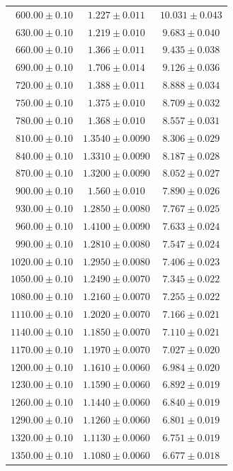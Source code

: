 \documentclass[a4paper,11pt]{article}
\begin{document}
\begin{longtable}{r c c}
$600.00 \pm 0.10$ & $1.227 \pm 0.011$ & $10.031 \pm 0.043$ \\
$630.00 \pm 0.10$ & $1.219 \pm 0.010$ & $9.683 \pm 0.040$ \\
$660.00 \pm 0.10$ & $1.366 \pm 0.011$ & $9.435 \pm 0.038$ \\
$690.00 \pm 0.10$ & $1.706 \pm 0.014$ & $9.126 \pm 0.036$ \\
$720.00 \pm 0.10$ & $1.388 \pm 0.011$ & $8.888 \pm 0.034$ \\
$750.00 \pm 0.10$ & $1.375 \pm 0.010$ & $8.709 \pm 0.032$ \\
$780.00 \pm 0.10$ & $1.368 \pm 0.010$ & $8.557 \pm 0.031$ \\
$810.00 \pm 0.10$ & $1.3540 \pm 0.0090$ & $8.306 \pm 0.029$ \\
$840.00 \pm 0.10$ & $1.3310 \pm 0.0090$ & $8.187 \pm 0.028$ \\
$870.00 \pm 0.10$ & $1.3200 \pm 0.0090$ & $8.052 \pm 0.027$ \\
$900.00 \pm 0.10$ & $1.560 \pm 0.010$ & $7.890 \pm 0.026$ \\
$930.00 \pm 0.10$ & $1.2850 \pm 0.0080$ & $7.767 \pm 0.025$ \\
$960.00 \pm 0.10$ & $1.4100 \pm 0.0090$ & $7.633 \pm 0.024$ \\
$990.00 \pm 0.10$ & $1.2810 \pm 0.0080$ & $7.547 \pm 0.024$ \\
$1020.00 \pm 0.10$ & $1.2950 \pm 0.0080$ & $7.406 \pm 0.023$ \\
$1050.00 \pm 0.10$ & $1.2490 \pm 0.0070$ & $7.345 \pm 0.022$ \\
$1080.00 \pm 0.10$ & $1.2160 \pm 0.0070$ & $7.255 \pm 0.022$ \\
$1110.00 \pm 0.10$ & $1.2020 \pm 0.0070$ & $7.166 \pm 0.021$ \\
$1140.00 \pm 0.10$ & $1.1850 \pm 0.0070$ & $7.110 \pm 0.021$ \\
$1170.00 \pm 0.10$ & $1.1970 \pm 0.0070$ & $7.027 \pm 0.020$ \\
$1200.00 \pm 0.10$ & $1.1610 \pm 0.0060$ & $6.984 \pm 0.020$ \\
$1230.00 \pm 0.10$ & $1.1590 \pm 0.0060$ & $6.892 \pm 0.019$ \\
$1260.00 \pm 0.10$ & $1.1440 \pm 0.0060$ & $6.840 \pm 0.019$ \\
$1290.00 \pm 0.10$ & $1.1260 \pm 0.0060$ & $6.801 \pm 0.019$ \\
$1320.00 \pm 0.10$ & $1.1130 \pm 0.0060$ & $6.751 \pm 0.019$ \\
$1350.00 \pm 0.10$ & $1.1080 \pm 0.0060$ & $6.677 \pm 0.018$ \\

\end{longtable}
\end{document}
